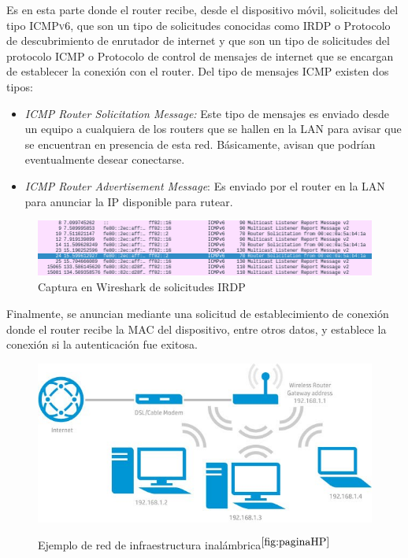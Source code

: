Es en esta parte donde el router recibe, desde el dispositivo móvil, solicitudes del tipo \textsc{ICMPv6}, que son un tipo de solicitudes conocidas como \ac{IRDP}  o Protocolo de descubrimiento de enrutador de internet y que son un tipo de solicitudes del protocolo \ac{ICMP} o Protocolo de control de mensajes de internet que se encargan de establecer la conexión con el router. Del tipo de mensajes ICMP existen dos tipos:\\

\begin{itemize}
\item{\textit{ICMP Router Solicitation Message:} Este tipo de mensajes es enviado desde un equipo a cualquiera de los routers que se hallen en la LAN para avisar que se encuentran en presencia de esta red. Básicamente, avisan que podrían eventualmente desear conectarse.}
\item{\textit{ICMP Router Advertisement Message}: Es enviado por el router en la LAN para anunciar la IP disponible para rutear.}\\
\end{itemize}

\begin{figure}[h!]
\centering
\includegraphics[scale=0.5]{./imagenes/IRDP}
\caption{Captura en Wireshark de solicitudes IRDP}
\label{fig:IRDP}
\end{figure}

Finalmente, se anuncian mediante una solicitud de establecimiento de conexión donde el router recibe la MAC del dispositivo, entre otros datos, y establece la conexión si la autenticación fue exitosa.\\


\begin{figure}[h!]
\centering
		\includegraphics[scale=0.5]{./imagenes/ap}
		\label{fig:access_point}
		\caption{Ejemplo de red de infraestructura inalámbrica$^{\ref{fig:paginaHP}}$}
\end{figure}

